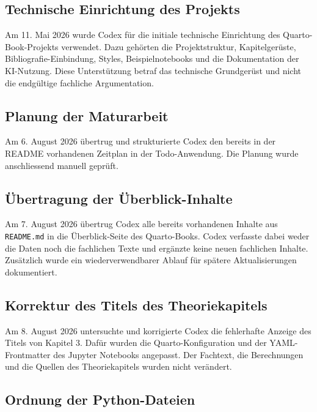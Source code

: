 \documentclass[
  ngerman,
  a4paper,
  DIV=11,
  oneside]{scrreprt}
\begin{document}
\subsection{Technische Einrichtung des
Projekts}\label{technische-einrichtung-des-projekts}

Am 11. Mai 2026 wurde Codex für die initiale technische Einrichtung des
Quarto-Book-Projekts verwendet. Dazu gehörten die Projektstruktur,
Kapitelgerüste, Bibliografie-Einbindung, Styles, Beispielnotebooks und
die Dokumentation der KI-Nutzung. Diese Unterstützung betraf das
technische Grundgerüst und nicht die endgültige fachliche Argumentation.

\subsection{Planung der Maturarbeit}\label{planung-der-maturarbeit}

Am 6. August 2026 übertrug und strukturierte Codex den bereits in der
README vorhandenen Zeitplan in der Todo-Anwendung. Die Planung wurde
anschliessend manuell geprüft.

\subsection{Übertragung der
Überblick-Inhalte}\label{uxfcbertragung-der-uxfcberblick-inhalte}

Am 7. August 2026 übertrug Codex alle bereits vorhandenen Inhalte aus
\texttt{README.md} in die Überblick-Seite des Quarto-Books. Codex
verfasste dabei weder die Daten noch die fachlichen Texte und ergänzte
keine neuen fachlichen Inhalte. Zusätzlich wurde ein wiederverwendbarer
Ablauf für spätere Aktualisierungen dokumentiert.

\subsection{Korrektur des Titels des
Theoriekapitels}\label{korrektur-des-titels-des-theoriekapitels}

Am 8. August 2026 untersuchte und korrigierte Codex die fehlerhafte
Anzeige des Titels von Kapitel 3. Dafür wurden die Quarto-Konfiguration
und der YAML-Frontmatter des Jupyter Notebooks angepasst. Der Fachtext,
die Berechnungen und die Quellen des Theoriekapitels wurden nicht
verändert.

\subsection{Ordnung der
Python-Dateien}\label{ordnung-der-python-dateien}
\end{document}

